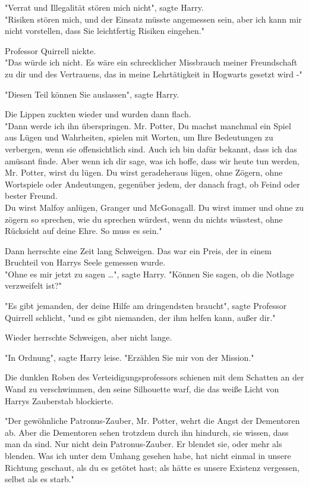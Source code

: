 {"Verrat und Illegalität stören mich nicht", sagte Harry.\\ "Risiken stören mich, und der Einsatz müsste angemessen sein, aber ich kann mir nicht vorstellen, dass Sie leichtfertig Risiken eingehen."

Professor Quirrell nickte.\\ "Das würde ich nicht. Es wäre ein schrecklicher Missbrauch meiner Freundschaft zu dir und des Vertrauens, das in meine Lehrtätigkeit in Hogwarts gesetzt wird -"

"Diesen Teil können Sie auslassen", sagte Harry.

Die Lippen zuckten wieder und wurden dann flach.\\ "Dann werde ich ihn überspringen. Mr. Potter, Du machst manchmal ein Spiel aus Lügen und Wahrheiten, spielen mit Worten, um Ihre Bedeutungen zu verbergen, wenn sie offensichtlich sind. Auch ich bin dafür bekannt, dass ich das amüsant finde. Aber wenn ich dir sage, was ich hoffe, dass wir heute tun werden, Mr. Potter, wirst du lügen. Du wirst geradeheraus lügen, ohne Zögern, ohne Wortspiele oder Andeutungen, gegenüber jedem, der danach fragt, ob Feind oder bester Freund.\\ Du wirst Malfoy anlügen, Granger und McGonagall. Du wirst immer und ohne zu zögern so sprechen, wie du sprechen würdest, wenn du nichts wüsstest, ohne Rücksicht auf deine Ehre. So muss es sein."

Dann herrschte eine Zeit lang Schweigen. Das war ein Preis, der in einem Bruchteil von Harrys Seele gemessen wurde.\\ "Ohne es mir jetzt zu sagen …", sagte Harry. "Können Sie sagen, ob die Notlage verzweifelt ist?"

"Es gibt jemanden, der deine Hilfe am dringendsten braucht", sagte Professor Quirrell schlicht, "und es gibt niemanden, der ihm helfen kann, außer dir."

Wieder herrschte Schweigen, aber nicht lange.

"In Ordnung", sagte Harry leise. "Erzählen Sie mir von der Mission."

Die dunklen Roben des Verteidigungsprofessors schienen mit dem Schatten an der Wand zu verschwimmen, den seine Silhouette warf, die das weiße Licht von Harrys Zauberstab blockierte.

"Der gewöhnliche Patronus-Zauber, Mr. Potter, wehrt die Angst der Dementoren ab. Aber die Dementoren sehen trotzdem durch ihn hindurch, sie wissen, dass man da sind. Nur nicht dein Patronus-Zauber. Er blendet sie, oder mehr als blenden. Was ich unter dem Umhang gesehen habe, hat nicht einmal in unsere Richtung geschaut, als du es getötet hast; als hätte es unsere Existenz vergessen, selbst als es starb."

}
